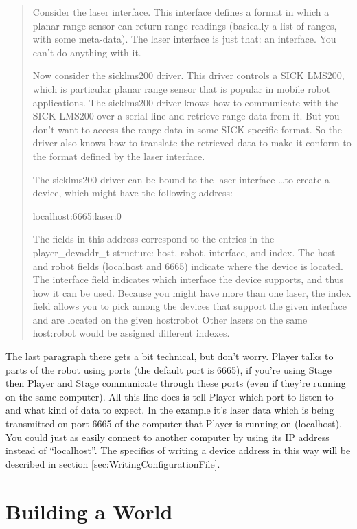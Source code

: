 \documentclass[a4paper]{report}
\newcommand{\pl}{Player\xspace}
\begin{document}
\begin{quotation}
	Consider the laser interface. This interface defines a format in which a planar range-sensor can return range readings (basically a list of ranges, with some meta-data). The laser interface is just that: an interface. You can't do anything with it.

	Now consider the sicklms200 driver. This driver controls a SICK LMS200, which is particular planar range sensor that is popular in mobile robot applications. The sicklms200 driver knows how to communicate with the SICK LMS200 over a serial line and retrieve range data from it. But you don't want to access the range data in some SICK-specific format. So the driver also knows how to translate the retrieved data to make it conform to the format defined by the laser interface.

	The sicklms200 driver can be bound to the laser interface \ldots to create a device, which might have the following address:

	localhost:6665:laser:0 \label{sec:setting_a_device}

	The fields in this address correspond to the entries in the \mbox{player\_devaddr\_t} structure: host, robot, interface, and index. The host and robot fields (localhost and 6665) indicate where the device is located. The interface field indicates which interface the device supports, and thus how it can be used. Because you might have more than one laser, the index field allows you to pick among the devices that support the given interface and are located on the given host:robot Other lasers on the same host:robot would be assigned different indexes.
\end{quotation}
The last paragraph there gets a bit technical, but don't worry. \pl talks to parts of the robot using ports (the default port is 6665), if you're using Stage then \pl and Stage communicate through these ports (even if they're running on the same computer). All this line does is tell \pl which port to listen to and what kind of data to expect. In the example it's laser data which is being transmitted on port 6665 of the computer that \pl is running on (localhost). You could just as easily connect to another computer by using its IP address instead of ``localhost''. The specifics of writing a device address in this way will be described in section \ref{sec:WritingConfigurationFile}.

\chapter{Building a World} \label{sec:BuildingAWorld}
\end{document}
